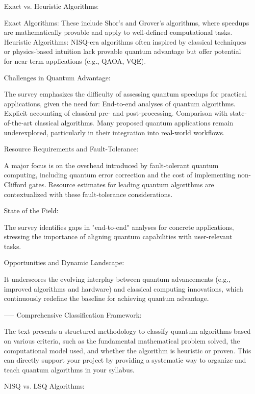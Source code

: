 Exact vs. Heuristic Algorithms:

    Exact Algorithms: These include Shor’s and Grover’s algorithms, where speedups are mathematically provable and apply to well-defined computational tasks.
    Heuristic Algorithms: NISQ-era algorithms often inspired by classical techniques or physics-based intuition lack provable quantum advantage but offer potential for near-term applications (e.g., QAOA, VQE).

Challenges in Quantum Advantage:

    The survey emphasizes the difficulty of assessing quantum speedups for practical applications, given the need for:
        End-to-end analyses of quantum algorithms.
        Explicit accounting of classical pre- and post-processing.
        Comparison with state-of-the-art classical algorithms.
    Many proposed quantum applications remain underexplored, particularly in their integration into real-world workflows.

Resource Requirements and Fault-Tolerance:

    A major focus is on the overhead introduced by fault-tolerant quantum computing, including quantum error correction and the cost of implementing non-Clifford gates.
    Resource estimates for leading quantum algorithms are contextualized with these fault-tolerance considerations.

State of the Field:

    The survey identifies gaps in "end-to-end" analyses for concrete applications, stressing the importance of aligning quantum capabilities with user-relevant tasks.

Opportunities and Dynamic Landscape:

It underscores the evolving interplay between quantum advancements (e.g., improved algorithms and hardware) and classical computing innovations, which continuously redefine the baseline for achieving quantum advantage.

-----
Comprehensive Classification Framework:

    The text presents a structured methodology to classify quantum algorithms based on various criteria, such as the fundamental mathematical problem solved, the computational model used, and whether the algorithm is heuristic or proven.
    This can directly support your project by providing a systematic way to organize and teach quantum algorithms in your syllabus.

NISQ vs. LSQ Algorithms:

